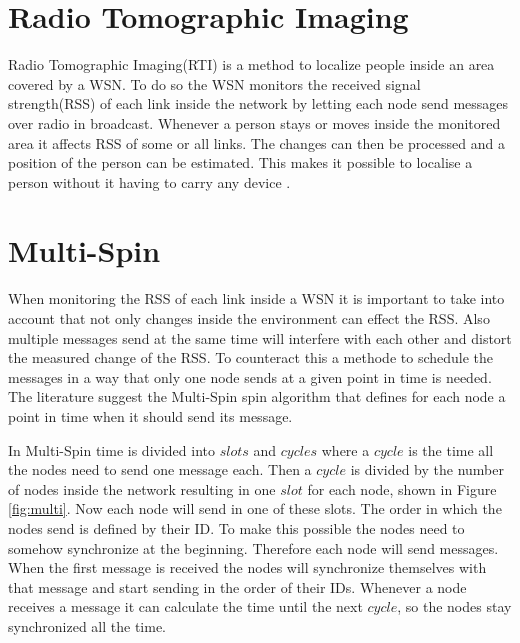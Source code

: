 	



\section{Radio Tomographic Imaging}
Radio Tomographic Imaging(RTI) is a method to localize people inside an area covered by a WSN. To do so the WSN monitors the received signal strength(RSS) of each link inside the network by letting each node send messages over radio in broadcast. Whenever a person stays or moves inside the monitored area it affects RSS of some or all links. The changes can then be processed and a position of the person can be estimated. This makes it possible to localise a person without it having to carry any device \cite{RtiMulti}.
\section{Multi-Spin}
When monitoring the RSS of each link inside a WSN it is important to take into account that not only changes inside the environment can effect the RSS. Also multiple messages send at the same time will interfere with each other and distort the measured change of the RSS. To counteract this a methode to schedule the messages in a way that only one node sends at a given point in time is needed. The literature suggest the Multi-Spin spin algorithm that defines for each node a point in time when it should send its message.

In Multi-Spin time is divided into $slots$ and $cycles$ where a $cycle$ is the time all the nodes need to send one message each. Then a $cycle$ is divided by the number of nodes inside the network resulting in one $slot$ for each node, shown in Figure \ref{fig:multi}. Now each node will send in one of these slots. The order in which the nodes send is defined by their ID. To make this possible the nodes need to somehow synchronize at the beginning. Therefore each node will send messages. When the first message is received the nodes will synchronize themselves with that message and start sending in the order of their IDs. Whenever a node receives a message it can calculate the time until the next $cycle$, so the nodes stay synchronized all the time.  \cite{RtiMulti}

